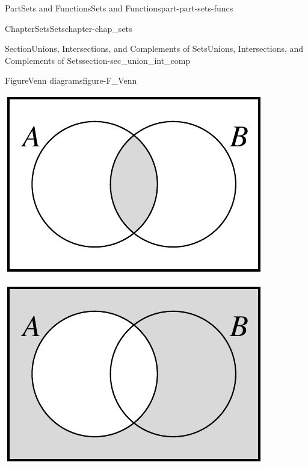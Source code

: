 \documentclass[oneside,10pt,]{book}
\numberwithin{equation}{chapter}
\begin{document}
\begin{partptx}{Part}{Sets and Functions}{}{Sets and Functions}{}{}{part-part-sets-funcs}
\begin{chapterptx}{Chapter}{Sets}{}{Sets}{}{}{chapter-chap_sets}
\begin{sectionptx}{Section}{Unions, Intersections, and Complements of Sets}{}{Unions, Intersections, and Complements of Sets}{}{}{section-sec_union_int_comp}
\begin{figureptx}{Figure}{Venn diagrams}{figure-F_Venn}{}
\begin{sidebyside}{3}{0}{0}{0}
\begin{sbspanel}{0.333333333333333}
\includegraphics[width=\linewidth]{external/Venn_Diagram_intersection.pdf}
\end{sbspanel}%
\begin{sbspanel}{0.333333333333333}%
\includegraphics[width=\linewidth]{external/Venn_Diagram_A_complement.pdf}
\end{sbspanel}%
\begin{sbspanel}{0.333333333333333}%

\end{sbspanel}
\end{sidebyside}
\end{figureptx}
\end{sectionptx}
\end{chapterptx}
\end{partptx}
\end{document}

